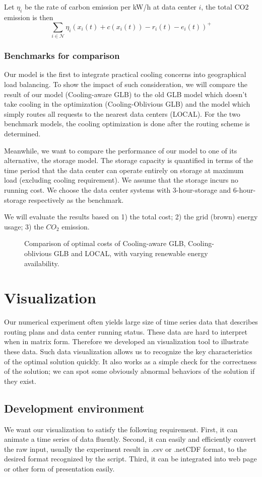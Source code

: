 \documentclass{acm_proc_article-sp}
\begin{document}
Let $\eta_i$ be the rate of carbon emission per kW/h at data center $i$, the total CO2 emission is then
$$\sum_{i \in \mathcal{N}} \eta_i(x_i(t) + c(x_i(t)) - r_i(t) - e_i(t))^+$$ 
\subsubsection{Benchmarks for comparison}
Our model is the first to integrate practical cooling concerns into geographical load balancing. To show the impact of such consideration, we will compare the result of our model (Cooling-aware GLB) to the old GLB model which doesn't take cooling in the optimization (Cooling-Oblivious GLB) and the model which simply routes all requests to the nearest data centers (LOCAL). For the two benchmark models, the cooling optimization is done after the routing scheme is determined.

Meanwhile, we want to compare the performance of our model to one of its alternative, the storage model. The storage capacity is quantified in terms of the time period that the data center can operate entirely on storage at maximum load (excluding cooling requirement). We assume that the storage incurs no running cost. We choose the data center systems with 3-hour-storage and 6-hour-storage respectively as the benchmark. 

We will evaluate the results based on 1) the total cost; 2) the grid (brown) energy usage; 3) the $CO_2$ emission.


\begin{figure*}
\centering
{}
\caption{Comparison of optimal costs of Cooling-aware GLB, Cooling-oblivious GLB and LOCAL, with varying renewable energy availability.}
\end{figure*}
\section{Visualization}
Our numerical experiment often yields large size of time series data that describes routing plans and data center running status. These data are hard to interpret when in matrix form. Therefore we developed an visualization tool to illustrate these data. Such data visualization allows us to recognize the key characteristics of the optimal solution quickly. It also works as a simple check for the correctness of the solution; we can spot some obviously abnormal behaviors of the solution if they exist. 


\subsection{Development environment}
We want our visualization to satisfy the following requirement. First, it can animate a time series of data fluently. Second, it can easily and efficiently convert the raw input, usually the experiment result in .csv or .netCDF format, to the desired format recognized by the script. Third, it can be integrated into web page or other form of presentation easily. 
\end{document}
